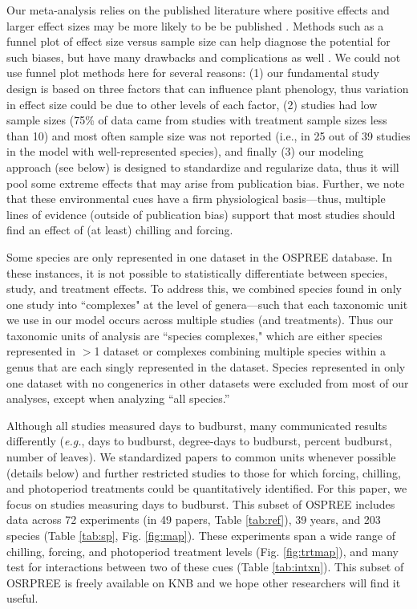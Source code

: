 \documentclass{article}
\begin{document}
\par Our meta-analysis relies on the published literature where positive effects and larger effect sizes may be more likely to be be published \emph{\citep{Kicinski2013}}. Methods such as a funnel plot of effect size versus sample size can help diagnose the potential for such biases, but have many drawbacks and complications as well \emph{\citep{Gurevitch1992,Gurevitch1999,Lin2018}}. We could not use funnel plot methods here for several reasons: (1) our fundamental study design is based on three factors that can influence plant phenology, thus variation in effect size could be due to other levels of each factor, (2) studies had low sample sizes (75\% of data came from studies with treatment sample sizes less than 10) and most often sample size was not reported (i.e., in 25 out of 39 studies in the model with well-represented species), and finally (3) our modeling approach (see below) is designed to standardize and regularize data, thus it will pool some extreme effects that may arise from publication bias. Further, we note that these environmental cues have a firm physiological basis---thus, multiple lines of evidence (outside of publication bias) support that most studies should find an effect of (at least) chilling and forcing. 

\par Some species are only represented in one dataset in the OSPREE database. In these instances, it is not possible to statistically differentiate between species, study, and treatment effects. To address this, we combined species found in only one study into ``complexes" at the level of genera---such that each taxonomic unit we use in our model occurs across multiple studies (and treatments). Thus our taxonomic units of analysis are ``species complexes," which are either species represented in $>$1 dataset or complexes combining multiple species within a genus that are each singly represented in the dataset. Species represented in only one dataset with no congenerics in other datasets were excluded from most of our analyses, except when analyzing ``all species.''

\par Although all studies measured days to budburst, many communicated results differently (\emph{e.g.}, days to budburst, degree-days to budburst, percent budburst, number of leaves). We standardized papers to common units whenever possible (details below) and further restricted studies to those for which forcing, chilling, and photoperiod treatments could be quantitatively identified. For this paper, we focus on studies measuring days to budburst. This subset of OSPREE includes data across 72 experiments (in 49 papers, Table \ref{tab:ref}), 39 years, and 203 species (Table \ref{tab:sp}, Fig. \ref{fig:map}). These experiments span a wide range of chilling, forcing, and photoperiod treatment levels (Fig. \ref{fig:trtmap}), and many test for interactions between two of these cues (Table \ref{tab:intxn}). This subset of OSRPREE is freely available on KNB \emph{\citep{wolkovich2019}} and we hope other researchers will find it useful. 
\end{document}
